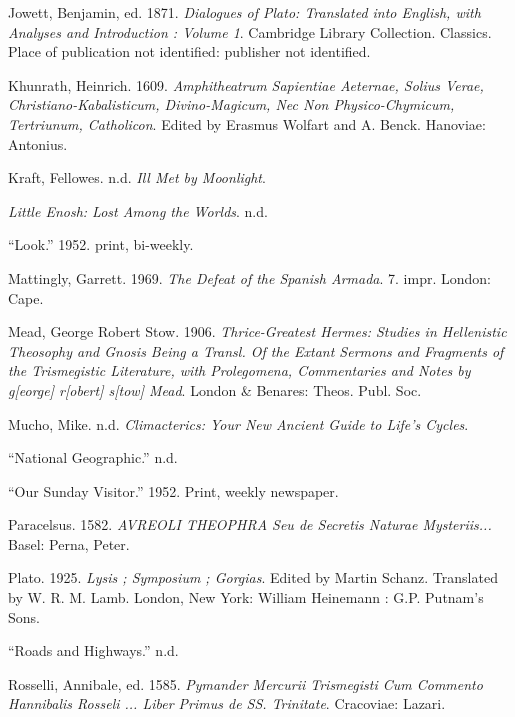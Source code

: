 \documentclass[
]{article}
\newlength{\cslhangindent}
\newenvironment{CSLReferences}[2] %
 {\begin{list}{}{%
  \setlength{\itemindent}{0pt}
  \setlength{\leftmargin}{0pt}
  \setlength{\parsep}{0pt}
  \ifodd #1
   \setlength{\leftmargin}{\cslhangindent}
   \setlength{\itemindent}{-1\cslhangindent}
  \fi
  \setlength{\itemsep}{#2\baselineskip}}}
 {\end{list}}
\begin{document}
\begin{CSLReferences}{1}{0}
Jowett, Benjamin, ed. 1871. \emph{Dialogues of Plato: Translated into
English, with Analyses and Introduction : Volume 1}. Cambridge Library
Collection. Classics. Place of publication not identified: publisher not
identified.

Khunrath, Heinrich. 1609. \emph{Amphitheatrum Sapientiae Aeternae,
Solius Verae, Christiano-Kabalisticum, Divino-Magicum, Nec Non
Physico-Chymicum, Tertriunum, Catholicon}. Edited by Erasmus Wolfart and
A. Benck. Hanoviae: Antonius.

Kraft, Fellowes. n.d. \emph{Ill Met by Moonlight}.

\emph{Little Enosh: Lost Among the Worlds}. n.d.

{``Look.''} 1952. print, bi-weekly.

Mattingly, Garrett. 1969. \emph{The Defeat of the Spanish Armada}. 7.
impr. London: Cape.

Mead, George Robert Stow. 1906. \emph{Thrice-Greatest Hermes: Studies in
Hellenistic Theosophy and Gnosis Being a Transl. Of the Extant Sermons
and Fragments of the Trismegistic Literature, with Prolegomena,
Commentaries and Notes by g{[}eorge{]} r{[}obert{]} s{[}tow{]} Mead}.
London \& Benares: Theos. Publ. Soc.

Mucho, Mike. n.d. \emph{Climacterics: Your New Ancient Guide to Life's
Cycles}.

{``National Geographic.''} n.d.

{``Our Sunday Visitor.''} 1952. Print, weekly newspaper.

Paracelsus. 1582. \emph{AVREOLI THEOPHRA Seu de Secretis Naturae
Mysteriis...} Basel: Perna, Peter.

Plato. 1925. \emph{Lysis ; Symposium ; Gorgias}. Edited by Martin
Schanz. Translated by W. R. M. Lamb. London, New York: William Heinemann
: G.P. Putnam's Sons.

{``Roads and Highways.''} n.d.

Rosselli, Annibale, ed. 1585. \emph{Pymander Mercurii Trismegisti Cum
Commento Hannibalis Rosseli ... Liber Primus de SS. Trinitate}.
Cracoviae: Lazari.


\end{CSLReferences}
\end{document}
